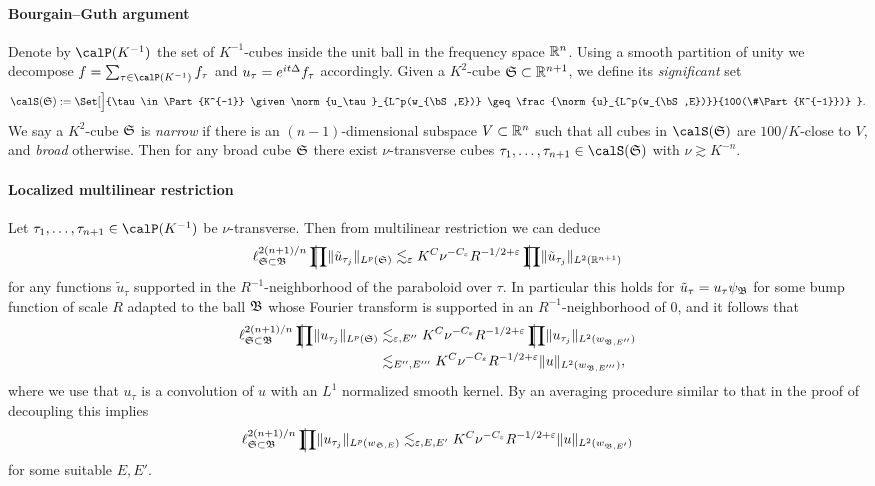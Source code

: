 \paragraph{Bourgain--Guth argument}
Denote by $\Part{K^{-1}}$ the set of $K^{-1}$-cubes inside the unit ball in the frequency space $\mathbb{R}^{n}$.
Using a smooth partition of unity we decompose $f = \sum_{\tau \in \Part{K^{-1}}} f_{\tau}$ and $u_{\tau} = e^{i t \Delta} f_{\tau}$ accordingly.
Given a $K^2$-cube $\mathfrak{S} \subset \mathbb{R}^{n+1}$, we define its \emph{significant} set
\[
\calS(\bS):=\Set[\Big]{\tau \in \Part{K^{-1}} \given \norm{u_\tau}_{L^p(w_{\bS,E})} \geq \frac{\norm{u}_{L^p(w_{\bS,E})}}{100(\#\Part{K^{-1}})} }.
\]
We say a $K^2$-cube $\mathfrak{S}$ is \emph{narrow} if there is an $(n-1)$-dimensional subspace $V \subset \mathbb{R}^{n}$ such that all cubes in $\calS(\bS)$ are $100/K$-close to $V$, and \emph{broad} otherwise.
Then for any broad cube $\mathfrak{S}$ there exist $\nu$-transverse cubes $\tau_1,\dotsc, \tau_{n+1} \in \calS(\bS)$ with $\nu \gtrsim K^{-n}$.

\paragraph{Localized multilinear restriction}
Let $\tau_{1},\dotsc,\tau_{n+1} \in \Part{K^{-1}}$ be $\nu$-transverse.
Then from multilinear restriction we can deduce
\[
\ell^{2(n+1)/n}_{\bS \subset \bB} \avprod \norm{ \tilde{u}_{\tau_{j}} }_{L^{p}(\bS)}
\lesssim_{\epsilon}
K^{C} \nu^{-C_{\epsilon}} R^{-1/2+\epsilon} \avprod \norm{ \tilde{u}_{\tau_{j}} }_{L^{2}(\R^{n+1})}
\]
for any functions $\tilde{u}_{\tau}$ supported in the $R^{-1}$-neighborhood of the paraboloid over $\tau$.
In particular this holds for $\tilde{u}_{\tau} = u_{\tau} \psi_{\mathfrak{B}}$ for some bump function of scale $R$ adapted to the ball $\mathfrak{B}$ whose Fourier transform is supported in an $R^{-1}$-neighborhood of $0$, and it follows that
\begin{align*}
\ell^{2(n+1)/n}_{\bS \subset \bB} \avprod \norm{ u_{\tau_{j}} }_{L^{p}(\bS)}
&\lesssim_{\epsilon,E''}
K^{C} \nu^{-C_{\epsilon}} R^{-1/2+\epsilon} \avprod \norm{ u_{\tau_{j}} }_{L^{2}(w_{\bB,E''})}\\
&\lesssim_{E'',E'''}
K^{C} \nu^{-C_{\epsilon}} R^{-1/2+\epsilon} \norm{ u }_{L^{2}(w_{\bB,E'''})},
\end{align*}
where we use that $u_{\tau}$ is a convolution of $u$ with an $L^{1}$ normalized smooth kernel.
By an averaging procedure similar to that in the proof of decoupling this implies
\begin{equation}
\label{eq:mult-restr:local}
\ell^{2(n+1)/n}_{\bS \subset \bB} \avprod \norm{ u_{\tau_{j}} }_{L^{p}(w_{\bS,E})}
\lesssim_{\epsilon,E,E'}
K^{C} \nu^{-C_{\epsilon}} R^{-1/2+\epsilon} \norm{ u }_{L^{2}(w_{\bB,E'})}
\end{equation}
for some suitable $E,E'$.

